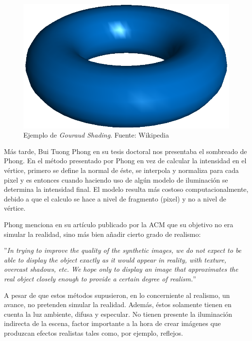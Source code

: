 \documentclass[titlepage,12pt]{report}
\begin{document}
\begin{figure}[ht]
	\centering
	\includegraphics[scale=0.25]{media/Gouraudshading00.png}
	\caption{Ejemplo de \textit{Gouraud Shading}. Fuente: Wikipedia}
	\label{Gouraud:shading}
\end{figure}

Más tarde, Bui Tuong Phong en su tesis doctoral \citep{Phong1975} nos presentaba el sombreado de Phong. En el método presentado por Phong en vez de calcular la intensidad en el vértice, primero se define la normal de éste, se interpola y normaliza para cada pixel y es entonces cuando haciendo uso de algún modelo de iluminación se determina la intensidad final. El modelo resulta más costoso computacionalmente, debido a que el calculo se hace a nivel de fragmento (pixel) y no a nivel de vértice.

Phong menciona en su artículo publicado por la ACM \citep[p.~311]{Phong1975} que su objetivo no era simular la realidad, sino más bien añadir cierto grado de realismo:
\vspace{5mm}

\begin{mdframed}[hidealllines=true,backgroundcolor=gray!20] ''\textit{In trying to improve the quality of the synthetic images, we do not expect to be able to display the object exactly as it would appear in reality, with texture, overcast shadows, etc. We hope only to display an image that approximates the real object closely enough to provide a certain degree of realism.}'' 
\end{mdframed}

A pesar de que estos métodos supusieron, en lo concerniente al realismo, un avance, no pretenden simular la realidad. Además, éstos solamente tienen en cuenta la luz ambiente, difusa y especular. No tienen presente la iluminación indirecta de la escena, factor importante a la hora de crear imágenes que produzcan efectos realistas tales como, por ejemplo, reflejos.
\end{document}
